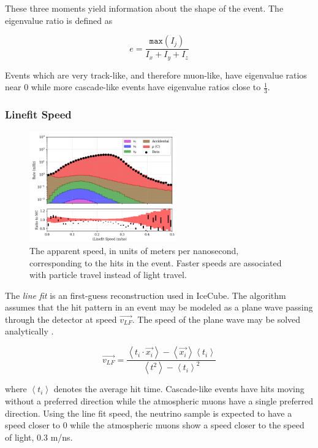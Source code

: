 These three moments yield information about the shape of the event.
The eigenvalue ratio is defined as 

\begin{equation}
	e = \frac{\mathtt{max}(I_j)}{I_{x}+I_{y}+I_{z}}
\end{equation}

Events which are very track-like, and therefore muon-like, have eigenvalue ratios near 0 while more cascade-like events have eigenvalue ratios close to $\frac{1}{3}$.


\subsubsection{Linefit Speed}
\begin{figure}[h]
	\centering
		\includegraphics[width=2.5in]{iLineFit_Log.png}
		\caption[The improvedLineFit Speed]{The apparent speed, in units of meters per nanosecond, corresponding to the hits in the event. Faster speeds are associated with particle travel instead of light travel.}
	\label{fig:ilinefit_log}
\end{figure}

The \emph{line fit} is an first-guess reconstruction used in IceCube.
The algorithm assumes that the hit pattern in an event may be modeled as a plane wave passing through the detector at speed $\vec{v_{LF}}$.
The speed of the plane wave may be solved analytically \cite{LineFit}.

\begin{equation}
\vec{v_{LF}} = \frac{\left<t_i \cdot \vec{x_i} \right> - \left<\vec{x_i}\right>\left<t_i\right>}{\left<t^2\right> - \left<t_i\right>^2}
\end{equation}

where $\left<t_i\right>$ denotes the average hit time.
Cascade-like events have hits moving without a preferred direction while the atmospheric muons have a single preferred direction.
Using the line fit speed, the neutrino sample is expected to have a speed closer to 0 while the atmospheric muons show a speed closer to the speed of light, 0.3 m/ns.

